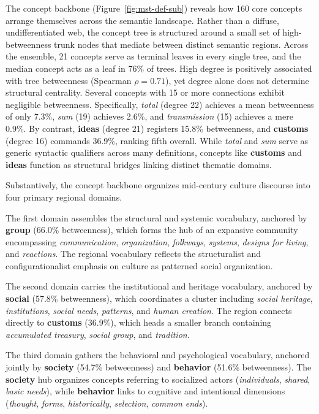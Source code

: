 \documentclass[11pt]{article}
\begin{document}
The concept backbone (Figure~\ref{fig:mst-def-sub}) reveals how 160 core concepts arrange themselves across the semantic landscape. Rather than a diffuse, undifferentiated web, the concept tree is structured around a small set of high-betweenness trunk nodes that mediate between distinct semantic regions. Across the ensemble, 21 concepts serve as terminal leaves in every single tree, and the median concept acts as a leaf in 76\% of trees. High degree is positively associated with tree betweenness (Spearman $\rho = 0.71$), yet degree alone does not determine structural centrality. Several concepts with 15 or more connections exhibit negligible betweenness. Specifically, \emph{total} (degree 22) achieves a mean betweenness of only 7.3\%, \emph{sum} (19) achieves 2.6\%, and \emph{transmission} (15) achieves a mere 0.9\%. By contrast, \textbf{ideas} (degree 21) registers 15.8\% betweenness, and \textbf{customs} (degree 16) commands 36.9\%, ranking fifth overall. While \emph{total} and \emph{sum} serve as generic syntactic qualifiers across many definitions, concepts like \textbf{customs} and \textbf{ideas} function as structural bridges linking distinct thematic domains.

Substantively, the concept backbone organizes mid-century culture discourse into four primary regional domains.

The first domain assembles the structural and systemic vocabulary, anchored by \textbf{group} (66.0\% betweenness), which forms the hub of an expansive community encompassing \emph{communication}, \emph{organization}, \emph{folkways}, \emph{systems}, \emph{designs for living}, and \emph{reactions}. The regional vocabulary reflects the structuralist and configurationalist emphasis on culture as patterned social organization.

The second domain carries the institutional and heritage vocabulary, anchored by \textbf{social} (57.8\% betweenness), which coordinates a cluster including \emph{social heritage}, \emph{institutions}, \emph{social needs}, \emph{patterns}, and \emph{human creation}. The region connects directly to \textbf{customs} (36.9\%), which heads a smaller branch containing \emph{accumulated treasury}, \emph{social group}, and \emph{tradition}.

The third domain gathers the behavioral and psychological vocabulary, anchored jointly by \textbf{society} (54.7\% betweenness) and \textbf{behavior} (51.6\% betweenness). The \textbf{society} hub organizes concepts referring to socialized actors (\emph{individuals}, \emph{shared}, \emph{basic needs}), while \textbf{behavior} links to cognitive and intentional dimensions (\emph{thought}, \emph{forms}, \emph{historically}, \emph{selection}, \emph{common ends}).
\end{document}
